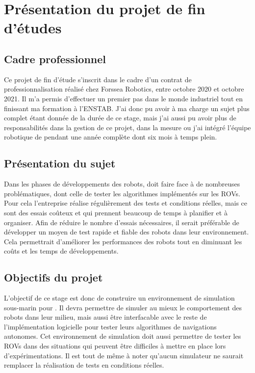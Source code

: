 	\section[Projet de fin d'études]{Présentation du projet de fin d'études}

		\subsection{Cadre professionnel}

			Ce projet de fin d'étude s'inscrit dans le cadre d'un contrat de professionnalisation réalisé chez Forssea Robotics, entre octobre 2020 et octobre 2021. Il m'a permis d'effectuer un premier pas dans le monde industriel tout en finissant ma formation à l'\gls{ENSTAB}. J'ai donc pu avoir à ma charge un sujet plus complet étant donnée de la durée de ce stage, mais j'ai aussi pu avoir plus de responsabilités dans la gestion de ce projet, dans la mesure ou j'ai intégré l'équipe robotique de \forssea{} pendant une année complète dont six mois à temps plein.

		\subsection{Présentation du sujet}

			Dans les phases de développements des robots, \forssea{} doit faire face à de nombreuses problématiques, dont celle de tester les algorithmes implémentés sur les \gls{ROV}s. Pour cela l'entreprise réalise régulièrement des tests et conditions réelles, mais ce sont des essais coûteux et qui prennent beaucoup de temps à planifier et à organiser. Afin de réduire le nombre d'essais nécessaires, il serait préférable de développer un moyen de test rapide et fiable des robots dans leur environnement. Cela permettrait d'améliorer les performances des robots tout en diminuant les coûts et les temps de développements.

		\subsection{Objectifs du projet}

			L'objectif de ce stage est donc de construire un environnement de simulation sous-marin pour \forssea{}. Il devra permettre de simuler au mieux le comportement des robots dans leur milieu, mais aussi être interfacable avec le reste de l'implémentation logicielle pour tester leurs algorithmes de navigations autonomes. Cet environnement de simulation doit aussi permettre de tester les \gls{ROV}s dans des situations qui peuvent être difficiles à mettre en place lors d'expérimentations. Il est tout de même à noter qu'aucun simulateur ne saurait remplacer la réalisation de tests en conditions réelles.

	